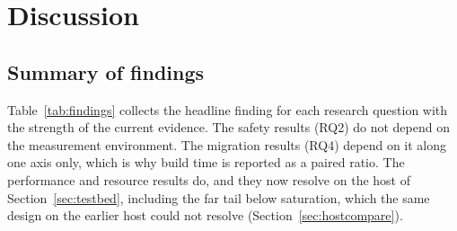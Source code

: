 \chapter{Discussion\label{chapter:discussion}}

\section{Summary of findings}
Table~\ref{tab:findings} collects the headline finding for each research question with the
strength of the current evidence. The safety results (RQ2) do not depend on the measurement
environment. The migration results (RQ4) depend on it along one axis only, which is why build
time is reported as a paired ratio. The performance and resource results do, and they now resolve
on the host of Section~\ref{sec:testbed}, including the far tail below saturation, which the same
design on the earlier host could not resolve (Section~\ref{sec:hostcompare}).

